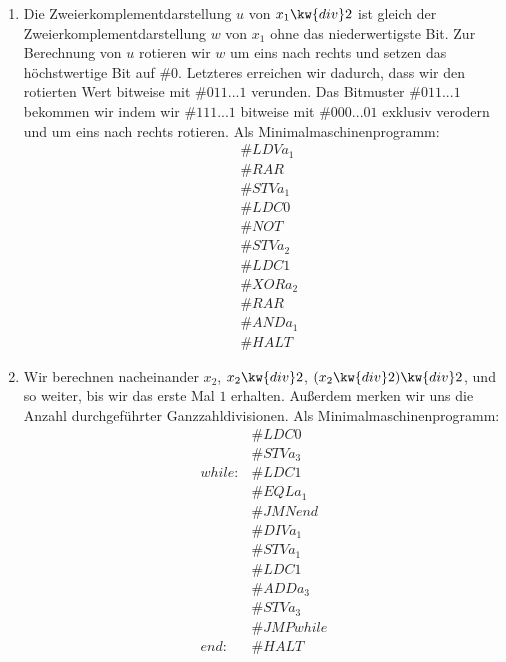 \documentclass[12pt]{article}
\newcommand{\lbl}[1]{\mathit{#1}}
\begin{document}
\begin{loesung}
  \begin{enumerate}
    \item Die Zweierkomplementdarstellung $u$ von $x_1 \kw{ div } 2$ ist gleich der Zweierkomplementdarstellung $w$ von $x_1$ ohne das niederwertigste Bit. Zur Berechnung von $u$ rotieren wir $w$ um eins nach rechts und setzen das höchstwertige Bit auf $\#0$. Letzteres erreichen wir dadurch, dass wir den rotierten Wert bitweise mit $\#{011...1}$ verunden. Das Bitmuster $\#{011...1}$ bekommen wir indem wir $\#{111...1}$ bitweise mit $\#{000...01}$ exklusiv verodern und um eins nach rechts rotieren. Als Minimalmaschinenprogramm:
          \begin{align*}
            & \#{LDV } a_1 \\
            & \#{RAR} \\
            & \#{STV } a_1 \\
            & \#{LDC } 0 \\
            & \#{NOT} \\
            & \#{STV } a_2 \\
            & \#{LDC } 1 \\
            & \#{XOR } a_2 \\
            & \#{RAR} \\
            & \#{AND } a_1 \\
            & \#{HALT}
          \end{align*}
    \item Wir berechnen nacheinander $x_2$, $x_2 \kw{ div } 2$, $(x_2 \kw{ div } 2) \kw{ div } 2$, und so weiter, bis wir das erste Mal $1$ erhalten. Außerdem merken wir uns die Anzahl durchgeführter Ganzzahldivisionen. Als Minimalmaschinenprogramm:
          \begin{align*}
                                & \#{LDC } 0 \\
                                & \#{STV } a_3 \\
            \lbl{while\colon}   & \#{LDC } 1 \\
                                & \#{EQL } a_1 \\
                                & \#{JMN } \lbl{end} \\
                                & \#{DIV } a_1 \\
                                & \#{STV } a_1 \\
                                & \#{LDC } 1 \\
                                & \#{ADD } a_3 \\
                                & \#{STV } a_3 \\
                                & \#{JMP } \lbl{while} \\
            \lbl{end\colon}     & \#{HALT}
          \end{align*}
  \end{enumerate}
\end{loesung}

\end{document}
